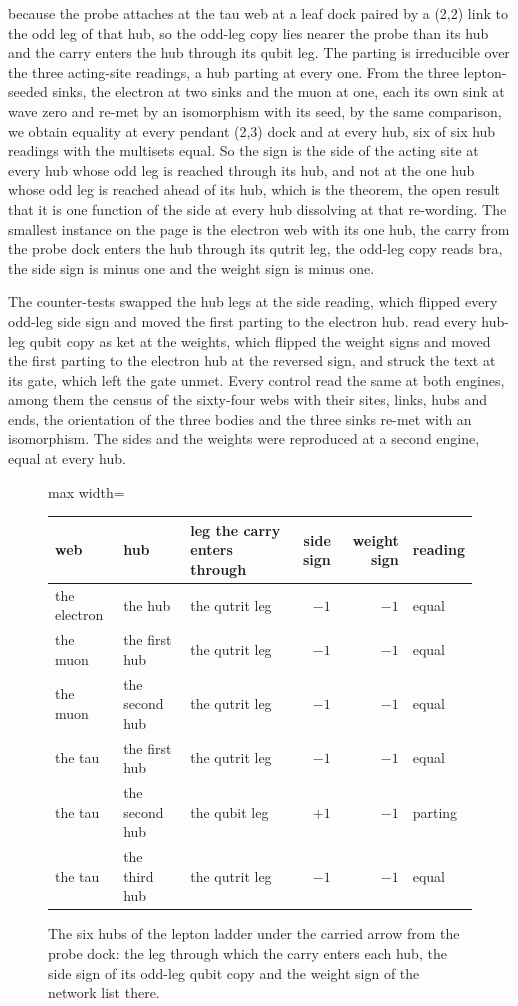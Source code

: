 \begin{chproof}[exact]
because the probe attaches at the tau web at a leaf dock paired by a (2,2) link to the odd leg of that hub, so the odd-leg copy lies nearer the probe than its hub and the carry enters the hub through its qubit leg. The parting is irreducible over the three acting-site readings, a hub parting at every one. From the three lepton-seeded sinks, the electron at two sinks and the muon at one, each its own sink at wave zero and re-met by an isomorphism with its seed, by the same comparison, we obtain equality at every pendant (2,3) dock and at every hub, six of six hub readings with the multisets equal. So the sign is the side of the acting site at every hub whose odd leg is reached through its hub, and not at the one hub whose odd leg is reached ahead of its hub, which is the theorem, the open result that it is one function of the side at every hub dissolving at that re-wording. The smallest instance on the page is the electron web with its one hub, the carry from the probe dock enters the hub through its qutrit leg, the odd-leg copy reads bra, the side sign is minus one and the weight sign is minus one.

The counter-tests swapped the hub legs at the side reading, which flipped every odd-leg side sign and moved the first parting to the electron hub. read every hub-leg qubit copy as ket at the weights, which flipped the weight signs and moved the first parting to the electron hub at the reversed sign, and struck the text at its gate, which left the gate unmet. Every control read the same at both engines, among them the census of the sixty-four webs with their sites, links, hubs and ends, the orientation of the three bodies and the three sinks re-met with an isomorphism. The sides and the weights were reproduced at a second engine, equal at every hub.
\end{chproof}
\begin{figure}[h]\centering
\begin{adjustbox}{max width=\linewidth}\begin{tabular}{lllrrl}\toprule
web & hub & leg the carry enters through & side sign & weight sign & reading \\ \midrule
the electron & the hub & the qutrit leg & $-1$ & $-1$ & equal \\
the muon & the first hub & the qutrit leg & $-1$ & $-1$ & equal \\
the muon & the second hub & the qutrit leg & $-1$ & $-1$ & equal \\
the tau & the first hub & the qutrit leg & $-1$ & $-1$ & equal \\
the tau & the second hub & the qubit leg & $+1$ & $-1$ & parting \\
the tau & the third hub & the qutrit leg & $-1$ & $-1$ & equal \\ \bottomrule
\end{tabular}\end{adjustbox}
\caption{The six hubs of the lepton ladder under the carried arrow from the probe dock: the leg through which the carry enters each hub, the side sign of its odd-leg qubit copy and the weight sign of the network list there.}
\end{figure}
